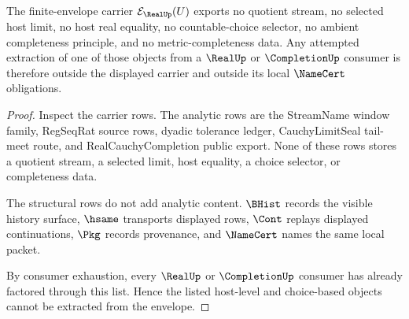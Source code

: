 \begin{theorem}
\label{thm:uniform-cauchy-criterion-real-completion-finite-envelope-no-choice-extraction}
The finite-envelope carrier $\mathcal{E}_{\RealUp}(U)$ exports no quotient stream, no selected host limit, no host real equality, no countable-choice selector, no ambient completeness principle, and no metric-completeness data. Any attempted extraction of one of those objects from a $\RealUp$ or $\CompletionUp$ consumer is therefore outside the displayed carrier and outside its local $\NameCert$ obligations.
\end{theorem}
\begin{proof}
Inspect the carrier rows. The analytic rows are the StreamName window family, RegSeqRat source rows, dyadic tolerance ledger, CauchyLimitSeal tail-meet route, and RealCauchyCompletion public export. None of these rows stores a quotient stream, a selected limit, host equality, a choice selector, or completeness data.

The structural rows do not add analytic content. $\BHist$ records the visible history surface, $\hsame$ transports displayed rows, $\Cont$ replays displayed continuations, $\Pkg$ records provenance, and $\NameCert$ names the same local packet.

By consumer exhaustion, every $\RealUp$ or $\CompletionUp$ consumer has already factored through this list. Hence the listed host-level and choice-based objects cannot be extracted from the envelope.
\end{proof}

